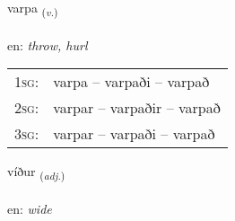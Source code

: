 \documentclass[frontgrid, backgrid]{flacards}\usepackage[]{graphicx}\usepackage[]{color}
\begin{document}
\renewcommand{\flhead}{\vskip5pt \fboxsep=0pt {\small\bfseries\footnotesize Sagnorð | Verb}}
\renewcommand{\fcfoot}{\vskip5pt \fboxsep=0pt \hspace{2pt}{\small\bfseries\footnotesize 2K}}

\renewcommand{\blhead}{\vskip5pt {\small\bfseries\footnotesize Sagnorð | Verb }}
\renewcommand{\bcfoot}{\vskip5pt \hspace{2pt}{\small\bfseries\footnotesize 2K}}


{varpa \small{\textsubscript{(\textit{v.})}} \\[1ex] %
\textphonetic{[var̥pa]} \\
en: \emph{throw, hurl} \\  [2ex]
\renewcommand*{\arraystretch}{0.8}
\begin{tabular}{p{1cm}l}
\textsc{1sg}: & varpa -- varpaði -- varpað \\ 
\textsc{2sg}: & varpar -- varpaðir -- varpað \\ 
\textsc{3sg}: & varpar -- varpaði -- varpað \\ 
\end{tabular}
}

\renewcommand{\flhead}{\vskip5pt \fboxsep=0pt {\small\bfseries\footnotesize Lýsingarorð | Adjective}}
\renewcommand{\fcfoot}{\vskip5pt \fboxsep=0pt \hspace{2pt}{\small\bfseries\footnotesize 2K}}

\renewcommand{\blhead}{\vskip5pt {\small\bfseries\footnotesize Lýsingarorð | Adjective }}
\renewcommand{\bcfoot}{\vskip5pt \hspace{2pt}{\small\bfseries\footnotesize 2K}}


{víður \small{\textsubscript{(\textit{adj.})}} \\[1ex] %
\textphonetic{[viːðʏr]} \\
en: \emph{wide} \\  [2ex]
\renewcommand*{\arraystretch}{0.8}
}
\end{document}
